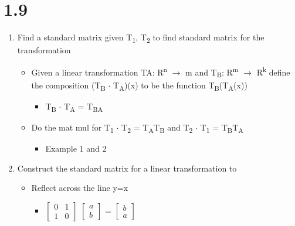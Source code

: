 \documentclass[letterpaper, 12pt]{article}
\begin{document}
\section{1.9}
\label{sec:orgbead088}
\begin{enumerate}
\item Find a standard matrix given T\textsubscript{1}, T\textsubscript{2} to find standard matrix for the transformation\\
\begin{itemize}
\item Given a linear transformation TA: R\textsuperscript{n} \(\rightarrow\) m and T\textsubscript{B}: R\textsuperscript{m} \(\rightarrow\) R\textsuperscript{k} define the composition (T\textsubscript{B} \(\cdot\) T\textsubscript{A})(x) to be the function T\textsubscript{B}(T\textsubscript{A}(x))\\
\begin{itemize}
\item T\textsubscript{B} \(\cdot\) T\textsubscript{A} = T\textsubscript{BA}\\
\end{itemize}
\item Do the mat mul for T\textsubscript{1} \(\cdot\) T\textsubscript{2} = T\textsubscript{A}T\textsubscript{B} and T\textsubscript{2} \(\cdot\) T\textsubscript{1} = T\textsubscript{B}T\textsubscript{A}\\
\begin{itemize}
\item Example 1 and 2\\
\end{itemize}
\end{itemize}
\item Construct the standard matrix for a linear transformation to\\
\begin{itemize}
\item Reflect across the line y=x\\
\begin{itemize}
\item \(\begin{bmatrix}0&1\\1&0\end{bmatrix}\) \(\begin{bmatrix}a\\b\end{bmatrix}\) = \(\begin{bmatrix}b\\a\end{bmatrix}\)\\

\end{itemize}
\end{itemize}
\end{enumerate}
\end{document}
